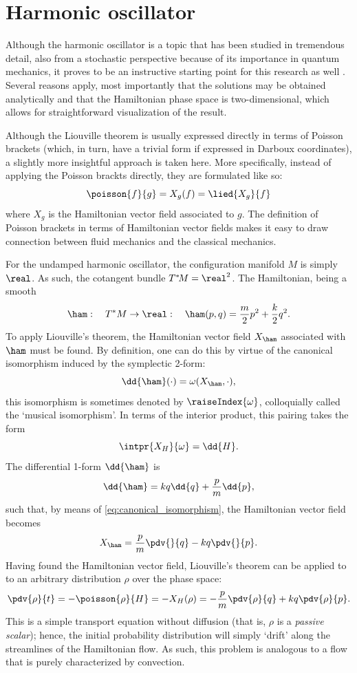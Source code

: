 \chapter{Harmonic oscillator}
Although the harmonic oscillator is a topic that has been studied in tremendous detail, also from a stochastic perspective because of its importance in quantum mechanics, it proves to be an instructive starting point for this research as well \cite{Dekker1975}. Several reasons apply, most importantly that the solutions may be obtained analytically and that the Hamiltonian phase space is two-dimensional, which allows for straightforward visualization of the result.

Although the Liouville theorem is usually expressed directly in terms of Poisson brackets (which, in turn, have a trivial form if expressed in Darboux coordinates), a slightly more insightful approach is taken here. More specifically, instead of applying the Poisson brackts directly, they are formulated like so:
$$ \poisson{f}{g} = X_g(f) = \lied{X_g}{f} $$
where $X_g$ is the Hamiltonian vector field associated to $g$. The definition of Poisson brackets in terms of Hamiltonian vector fields makes it easy to draw connection between fluid mechanics and the classical mechanics.

For the undamped harmonic oscillator, the configuration manifold $M$ is simply $\real$. As such, the cotangent bundle $T^*\!M = \real^2$. The Hamiltonian, being a smooth
\begin{equation}
    \ham:\quad T^*M \to \real:\quad \ham(p, q) = \frac{m}{2}p^2 + \frac{k}{2}q^2.
\end{equation}
To apply Liouville's theorem, the Hamiltonian vector field $X_\ham$ associated with $\ham$ must be found. By definition, one can do this by virtue of the canonical isomorphism induced by the symplectic 2-form:
$$ \dd{\ham}(\cdot) = \omega(X_{\ham}, \cdot), $$
this isomorphism is sometimes denoted by $\raiseIndex{\omega}$, colloquially called the `musical isomorphism'. In terms of the interior product, this pairing takes the form \cite{Osborne2017,Abraham1978}
\begin{equation} 
    \intpr{X_H}{\omega} = \dd{H}.
    \label{eq:canonical_isomorphism}
\end{equation}
The differential 1-form $\dd{\ham}$ is
$$ \dd{\ham} = kq\dd{q} + \frac{p}{m}\dd{p}, $$ 
such that, by means of \cref{eq:canonical_isomorphism}, the Hamiltonian vector field becomes
$$ X_{\ham} =  \frac{p}{m}\pdv{}{q} - kq\pdv{}{p}. $$
Having found the Hamiltonian vector field, Liouville's theorem can be applied to to an arbitrary distribution $\rho$ over the phase space:
\begin{equation}
    \pdv{\rho}{t} = -\poisson{\rho}{H} = -X_H(\rho) = -\frac{p}{m}\pdv{\rho}{q} + kq\pdv{\rho}{p}.
    \label{eq:pde_ho}
\end{equation}
This is a simple transport equation without diffusion (that is, $\rho$ is a \emph{passive scalar}); hence, the initial probability distribution will simply `drift' along the streamlines of the Hamiltonian flow. As such, this problem is analogous to a flow that is purely characterized by convection. 

